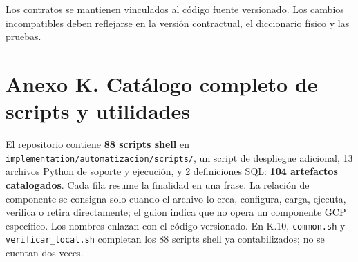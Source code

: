 \documentclass[11pt]{article}
\begin{document}
Los contratos se mantienen vinculados al código fuente versionado. Los cambios incompatibles deben reflejarse en la versión contractual, el diccionario físico y las pruebas.\par

\clearpage
\section*{Anexo K. Catálogo completo de scripts y utilidades}

El repositorio contiene \textbf{88 scripts shell} en \texttt{implementation/automatizacion/scripts/}, un script de despliegue adicional, 13 archivos Python de soporte y ejecución, y 2 definiciones SQL: \textbf{104 artefactos catalogados}. Cada fila resume la finalidad en una frase. La relación de componente se consigna solo cuando el archivo lo crea, configura, carga, ejecuta, verifica o retira directamente; el guion indica que no opera un componente GCP específico. Los nombres enlazan con el código versionado. En K.10, \texttt{common.sh} y \texttt{verificar\_local.sh} completan los 88 scripts shell ya contabilizados; no se cuentan dos veces.
\end{document}
